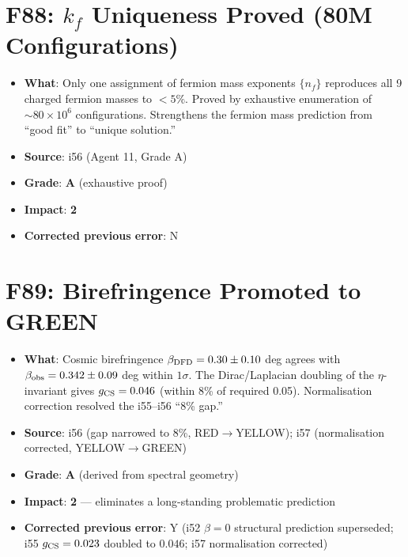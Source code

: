 \documentclass[11pt,a4paper]{article}
\newcommand{\grade}[1]{\textbf{#1}}
\newcommand{\impact}[1]{\textbf{#1}}
\begin{document}
\section{F88: $k_f$ Uniqueness Proved (80M Configurations)}
\begin{itemize}[nosep]
\item \textbf{What}: Only one assignment of fermion mass exponents $\{n_f\}$ reproduces all 9 charged fermion masses to $< 5\%$. Proved by exhaustive enumeration of $\sim 80 \times 10^6$ configurations. Strengthens the fermion mass prediction from ``good fit'' to ``unique solution.''
\item \textbf{Source}: i56 (Agent 11, Grade A)
\item \textbf{Grade}: \grade{A} (exhaustive proof)
\item \textbf{Impact}: \impact{2}
\item \textbf{Corrected previous error}: N
\end{itemize}

\section{F89: Birefringence Promoted to GREEN}
\begin{itemize}[nosep]
\item \textbf{What}: Cosmic birefringence $\beta_{\rm DFD} = 0.30 \pm 0.10$ deg agrees with $\beta_{\rm obs} = 0.342 \pm 0.09$ deg within $1\sigma$. The Dirac/Laplacian doubling of the $\eta$-invariant gives $g_{\rm CS} = 0.046$ (within 8\% of required 0.05). Normalisation correction resolved the i55--i56 ``8\% gap.''
\item \textbf{Source}: i56 (gap narrowed to 8\%, RED$\to$YELLOW); i57 (normalisation corrected, YELLOW$\to$GREEN)
\item \textbf{Grade}: \grade{A} (derived from spectral geometry)
\item \textbf{Impact}: \impact{2} --- eliminates a long-standing problematic prediction
\item \textbf{Corrected previous error}: Y (i52 $\beta = 0$ structural prediction superseded; i55 $g_{\rm CS} = 0.023$ doubled to $0.046$; i57 normalisation corrected)
\end{itemize}

\end{document}
